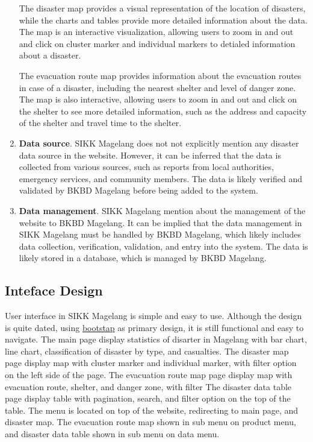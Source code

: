 \documentclass[a4paper,12pt]{article}
\begin{document}
\begin{enumerate}
        The disaster map provides a visual representation of the location of disasters, while the charts and tables provide more detailed information about the data.
        The map is an interactive visualization, allowing users to zoom in and out and click on cluster marker and individual markers to detialed information about a disaster.
        
        The evacuation route map provides information about the evacuation routes in case of a disaster, including the nearest shelter and level of danger zone.
        The map is also interactive, allowing users to zoom in and out and click on the shelter to see more detailed information, such as the address and capacity of the shelter and travel time to the shelter.
    \item \textbf{Data source}.
        SIKK Magelang does not not explicitly mention any disaster data source in the website.
        However, it can be inferred that the data is collected from various sources, such as reports from local authorities, emergency services, and community members.
        The data is likely verified and validated by BKBD Magelang before being added to the system.
    \item \textbf{Data management}.
        SIKK Magelang mention about the management of the website to BKBD Magelang.
        It can be implied that the data management in SIKK Magelang must be handled by BKBD Magelang,
        which likely includes data collection, verification, validation, and entry into the system.
        The data is likely stored in a database, which is managed by BKBD Magelang.
\end{enumerate}


\subsection{Inteface Design}
User interface in SIKK Magelang is simple and easy to use. Although the design is quite dated, using \href{https://getbootstrap.com/}{bootstap} as primary design, it is still functional and easy to navigate.
The main page display statistics of disarter in Magelang with bar chart, line chart, classification of disaster by type, and casualties.
The disaster map page display map with cluster marker and individual marker, with filter option on the left side of the page.
The evacuation route map page display map with evacuation route, shelter, and danger zone, with filter
The disaster data table page display table with pagination, search, and filter option on the top of the table.
The menu is located on top of the website, redirecting to main page, and disaster map. 
The evacuation route map shown in sub menu on product menu, and disaster data table shown in sub menu on data menu.
\end{document}
